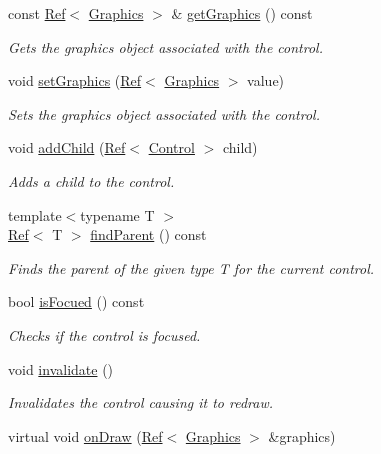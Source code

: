 \begin{DoxyCompactItemize}
const \mbox{\hyperlink{class_ref}{Ref}}$<$ \mbox{\hyperlink{class_graphics}{Graphics}} $>$ \& \mbox{\hyperlink{class_control_a9016bc607e76e382899be459e7d142ca}{get\+Graphics}} () const
\begin{DoxyCompactList}\small\item\em Gets the graphics object associated with the control. \end{DoxyCompactList}\item 
void \mbox{\hyperlink{class_control_a2cfc3f0fc6c83e80d4e083d5b50fe3ef}{set\+Graphics}} (\mbox{\hyperlink{class_ref}{Ref}}$<$ \mbox{\hyperlink{class_graphics}{Graphics}} $>$ value)
\begin{DoxyCompactList}\small\item\em Sets the graphics object associated with the control. \end{DoxyCompactList}\item 
void \mbox{\hyperlink{class_control_a3cec54dc733e8609e0b816c4e9e9f99d}{add\+Child}} (\mbox{\hyperlink{class_ref}{Ref}}$<$ \mbox{\hyperlink{class_control}{Control}} $>$ child)
\begin{DoxyCompactList}\small\item\em Adds a child to the control. \end{DoxyCompactList}\item 
{\footnotesize template$<$typename T $>$ }\\\mbox{\hyperlink{class_ref}{Ref}}$<$ T $>$ \mbox{\hyperlink{class_control_a2575b01d5c158f11986dea96ebc8b86e}{find\+Parent}} () const
\begin{DoxyCompactList}\small\item\em Finds the parent of the given type T for the current control. \end{DoxyCompactList}\item 
bool \mbox{\hyperlink{class_control_a310370bda804e4e9b80acdbc7f033402}{is\+Focued}} () const
\begin{DoxyCompactList}\small\item\em Checks if the control is focused. \end{DoxyCompactList}\item 
void \mbox{\hyperlink{class_control_a501fa3ad934e32bb8f904f8a49bd9c20}{invalidate}} ()
\begin{DoxyCompactList}\small\item\em Invalidates the control causing it to redraw. \end{DoxyCompactList}\item 
virtual void \mbox{\hyperlink{class_control_a5f89270d0d05a6bac9128db0b1d290d2}{on\+Draw}} (\mbox{\hyperlink{class_ref}{Ref}}$<$ \mbox{\hyperlink{class_graphics}{Graphics}} $>$ \&graphics)

\end{DoxyCompactItemize}

